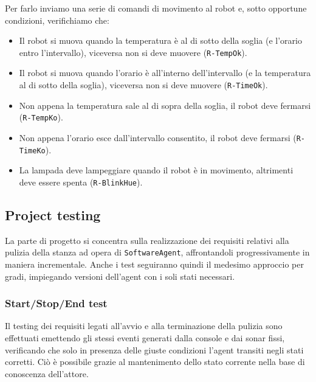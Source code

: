 \documentclass{../llncs}
\newcommand{\code}[1]{{\color{blue}\small{\texttt{#1}}}}
\begin{document}
Per farlo inviamo una serie di comandi di movimento al robot e, sotto opportune condizioni, verifichiamo che:
\begin{itemize}
\item Il robot si muova quando la temperatura è al di sotto della soglia (e l'orario entro l'intervallo), viceversa non si deve muovere (\code{R-TempOk}).
\item Il robot si muova quando l'orario è all'interno dell'intervallo (e la temperatura al di sotto della soglia), viceversa non si deve muovere (\code{R-TimeOk}).
\item Non appena la temperatura sale al di sopra della soglia, il robot deve fermarsi (\code{R-TempKo}).
\item Non appena l'orario esce dall'intervallo consentito, il robot deve fermarsi (\code{R-TimeKo}).
\item La lampada deve lampeggiare quando il robot è in movimento, altrimenti deve essere spenta (\code{R-BlinkHue}).
\end{itemize}



\subsection{Project testing}
La parte di progetto si concentra sulla realizzazione dei requisiti relativi alla pulizia della stanza ad opera di \texttt{SoftwareAgent}, affrontandoli progressivamente in maniera incrementale. Anche i test seguiranno quindi il medesimo approccio per gradi, impiegando versioni dell'agent con i soli stati necessari.

\subsubsection{Start/Stop/End test}
Il testing dei requisiti legati all'avvio e alla terminazione della pulizia sono effettuati emettendo gli stessi eventi generati dalla console e dai sonar fissi, verificando che solo in presenza delle giuste condizioni l'agent transiti negli stati corretti. Ciò è possibile grazie al mantenimento dello stato corrente nella base di conoscenza dell'attore.\\


\end{document}
